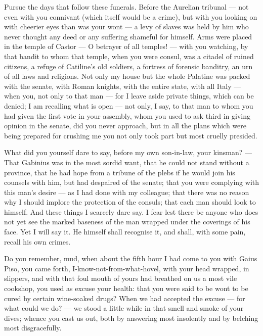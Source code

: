  Pursue the days that follow these funerals. Before the Aurelian tribunal — not even with you connivant (which itself would be a crime), but with you looking on with cheerier eyes than was your wont — a levy of slaves was held by him who never thought any deed or any suffering shameful for himself. Arms were placed in the temple of Castor — O betrayer of all temples! — with you watching, by that bandit to whom that temple, when you were consul, was a citadel of ruined citizens, a refuge of Catiline's old soldiers, a fortress of forensic banditry, an urn of all laws and religions. Not only my house but the whole Palatine was packed with the senate, with Roman knights, with the entire state, with all Italy — when you, not only to that man — for I leave aside private things, which can be denied; I am recalling what is open — not only, I say, to that man to whom you had given the first vote in your assembly, whom you used to ask third in giving opinion in the senate, did you never approach, but in all the plans which were being prepared for crushing me you not only took part but most cruelly presided.

 What did you yourself dare to say, before my own son-in-law, your kinsman? — That Gabinius was in the most sordid want, that he could not stand without a province, that he had hope from a tribune of the plebs if he would join his counsels with him, but had despaired of the senate; that you were complying with this man's desire — as I had done with my colleague; that there was no reason why I should implore the protection of the consuls; that each man should look to himself. And these things I scarcely dare say. I fear lest there be anyone who does not yet see the marked baseness of the man wrapped under the coverings of his face. Yet I will say it. He himself shall recognise it, and shall, with some pain, recall his own crimes.

 Do you remember, mud, when about the fifth hour I had come to you with Gaius Piso, you came forth, I-know-not-from-what-hovel, with your head wrapped, in slippers, and with that foul mouth of yours had breathed on us a most vile cookshop, you used as excuse your health: that you were said to be wont to be cured by certain wine-soaked drugs? When we had accepted the excuse — for what could we do? — we stood a little while in that smell and smoke of your dives; whence you cast us out, both by answering most insolently and by belching most disgracefully.

